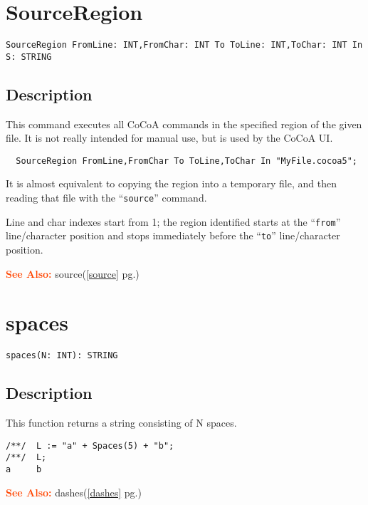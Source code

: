 \documentclass[a4paper]{mybook}
\newenvironment{command}{}{} %
\newcommand\SeeAlso{\par\textcolor{OrangeRed}{\textbf{\large See Also: }}}
\begin{document}
\section{SourceRegion}
\label{SourceRegion}
\begin{command} %


\begin{Verbatim}[label=syntax, rulecolor=\color{MidnightBlue},
frame=single]
SourceRegion FromLine: INT,FromChar: INT To ToLine: INT,ToChar: INT In S: STRING
\end{Verbatim}


\subsection*{Description}

This command executes all CoCoA commands in the specified region of the
given file. It is not really intended for manual use, but is used by the
CoCoA UI.
\begin{verbatim}
  SourceRegion FromLine,FromChar To ToLine,ToChar In "MyFile.cocoa5";
\end{verbatim}
It is almost equivalent to copying the region into a temporary file, and
then reading that file with the ``\verb&source&'' command.
\par 
Line and char indexes start from 1; the region identified starts at the
``\verb&from&'' line/character position and stops immediately before the ``\verb&to&''
line/character position.

\SeeAlso %
  source(\ref{source} pg.\pageref{source})
\end{command} %

\section{spaces}
\label{spaces}
\begin{command} %


\begin{Verbatim}[label=syntax, rulecolor=\color{MidnightBlue},
frame=single]
spaces(N: INT): STRING
\end{Verbatim}


\subsection*{Description}

This function returns a string consisting of N spaces.
\begin{Verbatim}[label=example, rulecolor=\color{PineGreen}, frame=single]
/**/  L := "a" + Spaces(5) + "b";
/**/  L;
a     b
\end{Verbatim}


\SeeAlso %
  dashes(\ref{dashes} pg.\pageref{dashes})
\end{command} %
\end{document}
